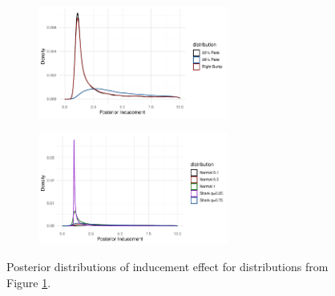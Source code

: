 \documentclass[aoas,preprint, 11pt, dvipsnames, table, x11name]{imsart}
\theoremstyle{remark}
\begin{document}
\begin{figure}[ht]
	\centering 
	\begin{subfigure}{.5\textwidth}
		\includegraphics[width=6.25cm]{induce_post_bumps}
	\end{subfigure}%
	\begin{subfigure}{.5\textwidth}
		\includegraphics[width=6.25cm]{induce_post_sharksnorm}
	\end{subfigure}
	\caption{Posterior distributions of inducement effect for distributions from Figure \ref{f_post_plots}. }
	\label{f_post_plots}
\end{figure}
\clearpage
\end{document}
